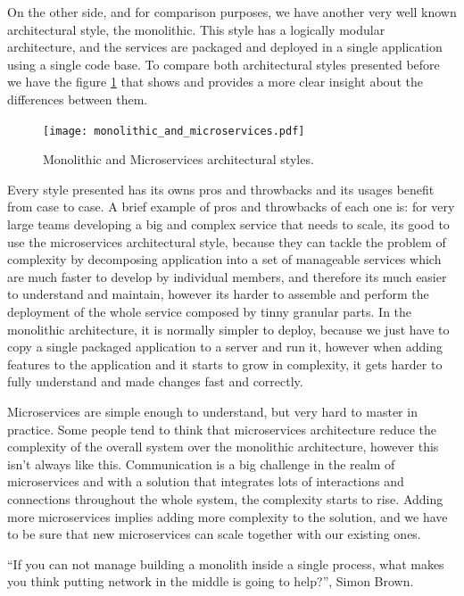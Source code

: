 On the other side, and for comparison purposes, we have another very well known architectural style, the monolithic. This style has a logically modular architecture, and the services are packaged and deployed in a single  application using a single code base. To compare both architectural styles presented before we have the figure \ref{fig:monolithic_and_microservices} that shows and provides a more clear insight about the differences between them.

\begin{figure}[H]
    \centering
    \texttt{[image: monolithic\_and\_microservices.pdf]}
    \caption{Monolithic and Microservices architectural styles\cite{microservices}.}
    \label{fig:monolithic_and_microservices}
\end{figure}

Every style presented has its owns pros and throwbacks and its usages benefit from case to case. A brief example of pros and throwbacks of each one is: for very large teams developing a big and complex service that needs to scale, its good to use the microservices architectural style, because they can tackle the problem of complexity by decomposing application into a set of manageable services which are much faster to develop by individual members, and therefore its much easier to understand and maintain, however its harder to assemble and perform the deployment of the whole service composed by tinny granular parts. In the monolithic architecture, it is normally simpler to deploy, because we  just have to copy a single packaged application to a server and run it, however when adding features to the application and it starts to grow in complexity, it gets harder to fully understand and made changes fast and correctly.

Microservices are simple enough to understand, but very hard to master in practice. Some people tend to think that microservices architecture reduce the complexity of the overall system over the monolithic architecture, however this isn't always like this. Communication is a big challenge in the realm of microservices and with a solution that integrates lots of interactions and connections throughout the whole system, the complexity starts to rise. Adding more microservices implies adding more complexity to the solution, and we have to be sure that new microservices can scale together with our existing ones.

``If you can not manage building a monolith inside a single process, what makes you think putting network in the middle is going to help?'', Simon Brown\cite{simon_brown_microservices}.

